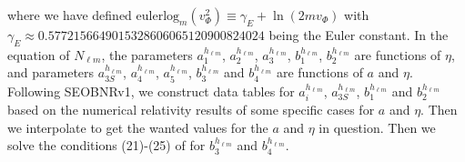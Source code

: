 \documentclass[prd,aps,a4paper,superscriptaddress,twocolumn,footinbib,showpacs]{revtex4}
\begin{document}
where we have defined $\text{eulerlog}_m(v_\Phi^2)\equiv\gamma_E+\ln(2mv_\Phi)$ with $\gamma_E\approx0.5772156649015328606065120900824024$ being the Euler constant. In the equation of $N_{\ell m}$, the parameters $a_{1}^{h_{\ell m}}$, $a_{2}^{h_{\ell m}}$, $a_{3}^{h_{\ell m}}$, $b_{1}^{h_{\ell m}}$, $b_{2}^{h_{\ell m}}$ are functions of $\eta$, and parameters $a_{3S}^{h_{\ell m}}$, $a_{4}^{h_{\ell m}}$, $a_{5}^{h_{\ell m}}$, $b_3^{h_{\ell m}}$ and $b_4^{h_{\ell m}}$ are functions of $a$ and $\eta$. Following SEOBNRv1, we construct data tables for $a_{i}^{h_{\ell m}}$, $a_{3S}^{h_{\ell m}}$, $b_{1}^{h_{\ell m}}$ and $b_{2}^{h_{\ell m}}$ based on the numerical relativity results of some specific cases for $a$ and $\eta$. Then we interpolate to get the wanted values for the $a$ and $\eta$ in question. Then we solve the conditions (21)-(25) of \cite{PhysRevD.86.024011} for $b_3^{h_{\ell m}}$ and $b_4^{h_{\ell m}}$.
\end{document}
